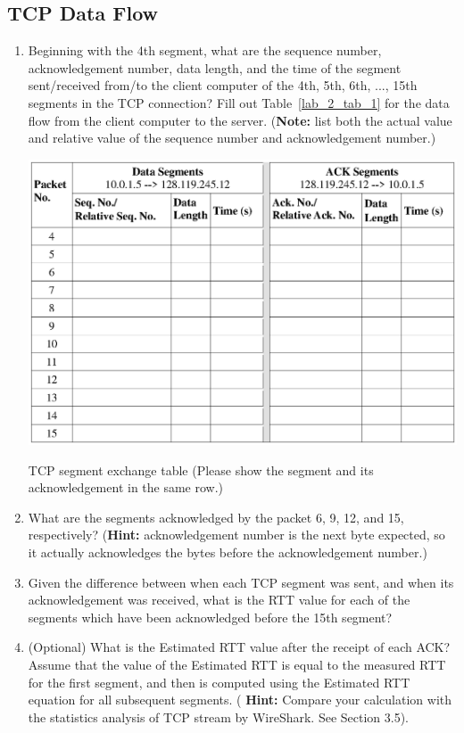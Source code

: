 \subsection{TCP Data Flow}\label{sec:2.4.3}
\begin{enumerate}
\item Beginning with the 4th segment, what are the sequence number,
  acknowledgement number, data length, and the time of the segment
  sent/received from/to the client computer of the 4th, 5th, 6th, ...,
  15th segments in the TCP connection? Fill out Table~\ref{lab_2_tab_1} for the data
  flow from the client computer to the server. ({\bf Note:} list both the actual
  value and relative value of the sequence number and acknowledgement
  number.)
\begin{table}[ht]
    \centering
    \includegraphics[width=0.75\columnwidth]{figs/lab_4_table_1.eps}
    \caption{TCP segment exchange table (Please show the segment and its acknowledgement in the same row.)}\label{lab_2_tab_1}
\end{table}

\item What are the segments acknowledged by the packet 6, 9, 12, and
  15, respectively? ({\bf Hint:} acknowledgement number is the next
  byte expected, so it actually acknowledges the bytes before the
  acknowledgement number.)

\item Given the difference between when each TCP segment was sent, and
  when its acknowledgement was received, what is the RTT value for each
  of the segments which have been acknowledged before the 15th
  segment?

\item (Optional) What is the Estimated RTT value after the receipt of
  each ACK?  Assume that the value of the Estimated RTT is equal to
  the measured RTT for the first segment, and then is computed using
  the Estimated RTT equation for all subsequent segments.  ({\bf
    Hint:} Compare your calculation with the statistics analysis of
  TCP stream by WireShark.  See Section 3.5).


\end{enumerate}
